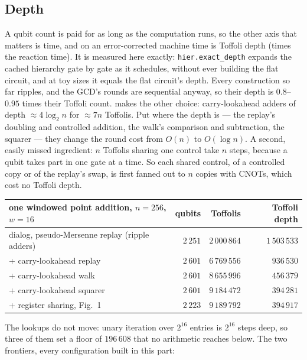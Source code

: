 \documentclass[11pt]{article}
\theoremstyle{plain}
\theoremstyle{remark}
\begin{document}
\subsection{Depth}\label{ec:sec:depth}

A qubit count is paid for as long as the computation runs, so the other axis that matters is time,
and on an error-corrected machine time is Toffoli depth (times the reaction time). It is measured
here exactly: \texttt{hier.exact\_depth} expands the cached hierarchy gate by gate as it
schedules, without ever building the flat circuit, and at toy sizes it equals the flat circuit's
depth. Every construction so far ripples, and the GCD's rounds are sequential anyway, so their
depth is $0.8$--$0.95$ times their Toffoli count. \cite{ec:kim26} makes the other choice:
carry-lookahead adders \cite{ec:dkrs04} of depth $\approx4\log_2 n$ for $\approx7n$ Toffolis.
Put where the depth is --- the replay's doubling and controlled addition, the walk's comparison and
subtraction, the squarer --- they change the round cost from $O(n)$ to $O(\log n)$. A second, easily
missed ingredient: $n$ Toffolis sharing one control take $n$ steps, because a qubit takes part in
one gate at a time. So each shared control, of a controlled copy or of the replay's swap, is first
fanned out to $n$ copies with CNOTs, which cost no Toffoli depth.

\begin{center}\small
\begin{tabular}{lrrr}
\toprule
one windowed point addition, $n=256$, $w=16$ & qubits & Toffolis & Toffoli depth\\
\midrule
dialog, pseudo-Mersenne replay (ripple adders) & $2\,251$ & $2\,000\,864$ & $1\,503\,533$\\
\quad + carry-lookahead replay & $2\,601$ & $6\,769\,556$ & $936\,530$\\
\quad + carry-lookahead walk & $2\,601$ & $8\,655\,996$ & $456\,379$\\
\quad + carry-lookahead squarer & $2\,601$ & $9\,184\,472$ & $394\,281$\\
\quad + register sharing, Fig.~1 & $2\,223$ & $9\,189\,792$ & $394\,917$\\
\bottomrule
\end{tabular}
\end{center}

The lookups do not move: unary iteration over $2^{16}$ entries is $2^{16}$ steps deep, so three
of them set a floor of $196\,608$ that no arithmetic reaches below. The two frontiers, every
configuration built in this part:
\end{document}
